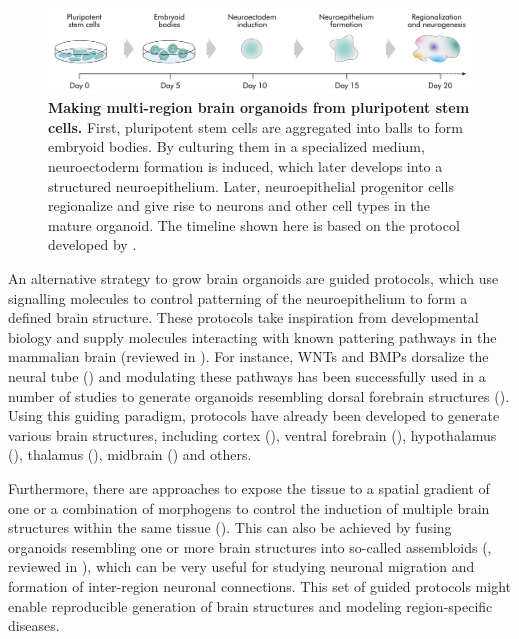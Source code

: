 \begin{figure}[t!]
  \centering
\includegraphics[width=\textwidth]{figures/introduction/Figure_organoid}
  \caption{\textbf{Making multi-region brain organoids from pluripotent stem cells.} First, pluripotent stem cells are aggregated into balls to form embryoid bodies. By culturing them in a specialized medium, neuroectoderm formation is induced, which later develops into a structured neuroepithelium. Later, neuroepithelial progenitor cells regionalize and give rise to neurons and other cell types in the mature organoid. The timeline shown here is based on the protocol developed by \cite{lancaster_cerebral_2013}.}
  \label{fig:intro3}
\end{figure}

An alternative strategy to grow brain organoids are guided protocols, which use signalling molecules to control patterning of the neuroepithelium to form a defined brain structure. These protocols take inspiration from  developmental biology and supply molecules interacting with known pattering pathways in the mammalian brain (reviewed in \cite{chiaradia_brain_2020}). For instance, WNTs and BMPs dorsalize the neural tube (\cite{dickinson_dorsalization_1995,saint-jeannet_regulation_1997}) and modulating these pathways has been successfully used in a number of studies to generate organoids resembling dorsal forebrain structures (\cite{xiang_fusion_2017,pasca_functional_2015,qian_brain-region-specific_2016,qian_sliced_2020}). Using this guiding paradigm, protocols have already been developed to generate various brain structures, including cortex (\cite{eiraku_self-organizing_2011,kadoshima_self-organization_2013,pasca_functional_2015,velasco_individual_2019}), ventral forebrain (\cite{miura_generation_2020,birey_assembly_2017,xiang_fusion_2017,bagley_fused_2017}), hypothalamus (\cite{qian_brain-region-specific_2016}), thalamus (\cite{xiang_hesc-derived_2019}), midbrain (\cite{qian_brain-region-specific_2016,monzel_derivation_2017,kim_modeling_2019}) and others. 

Furthermore, there are approaches to expose the tissue to a spatial gradient of one or a combination of morphogens to control the induction of multiple brain structures within the same tissue (\cite{rifes_modeling_2020,cederquist_specification_2019}). This can also be achieved by fusing organoids resembling one or more brain structures into so-called assembloids (\cite{bagley_fused_2017,birey_assembly_2017,xiang_fusion_2017}, reviewed in \cite{pasca_rise_2018}), which can be very useful for studying neuronal migration and formation of inter-region neuronal connections. This set of guided protocols might enable reproducible generation of brain structures and modeling region-specific diseases.



